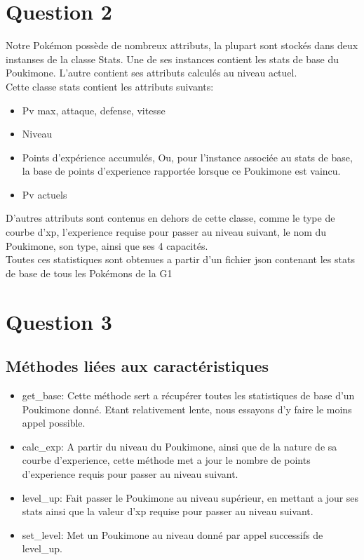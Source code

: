 \documentclass{report}
\begin{document}
\section*{Question 2}
Notre Pokémon possède de nombreux attributs, la plupart sont stockés dans deux instanses de la classe Stats. Une de ses instances contient les stats de base du Poukimone. L'autre contient ses attributs calculés au niveau actuel.
\\Cette classe stats contient les attributs suivants:
\begin{itemize}
    \item{Pv max, attaque, defense, vitesse}
    \item{Niveau}
    \item{Points d'expérience accumulés, Ou, pour l'instance associée au stats de base, la base de points d'experience rapportée lorsque ce Poukimone est vaincu.}
    \item{Pv actuels}
\end{itemize}
D'autres attributs sont contenus en dehors de cette classe, comme le type de courbe d'xp, l'experience requise pour passer au niveau suivant, le nom du Poukimone, son type, ainsi que ses 4 capacités.
\\ Toutes ces statistiques sont obtenues a partir d'un fichier json contenant les stats de base de tous les Pokémons de la G1
\section*{Question 3}
\subsection*{Méthodes liées aux caractéristiques}

\begin{itemize}
    \item{get\_base:}
        Cette méthode sert a récupérer toutes les statistiques de base d'un Poukimone donné. Etant relativement lente, nous essayons d'y faire le moins appel possible.\\
    \item{calc\_exp:}
        A partir du niveau du Poukimone, ainsi que de la nature de sa courbe d'experience, cette méthode met a jour le nombre de points d'experience requis pour passer au niveau suivant.\\
    \item{level\_up:}
        Fait passer le Poukimone au niveau supérieur, en mettant a jour ses stats ainsi que la valeur d'xp requise pour passer au niveau suivant.\\
    \item{set\_level:}
        Met un Poukimone au niveau donné par appel successifs de level\_up.
\end{itemize}
\end{document}
